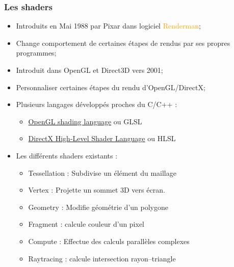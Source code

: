 \documentclass{beamer}
\begin{document}
\begin{frame}[fragile]
\frametitle{Les shaders}

\begin{itemize}
\item Introduits en Mai 1988 par Pixar dans logiciel \textcolor{orange}{Renderman};
\item Change comportement de certaines étapes de rendus par ses propres programmes;
\item Introduit dans OpenGL et Direct3D vers 2001;
\item Personnaliser certaines étapes du rendu d'OpenGL/DirectX;
\item Plusieurs langages développés proches du C/C++ :
      \begin{itemize}
      \small
      \item \href{https://registry.khronos.org/OpenGL/specs/gl/GLSLangSpec.4.60.pdf}{\textcolor{NavyBlue}{OpenGL shading language}} ou \textcolor{BrickRed}{GLSL}
      \item \href{https://microsoft.github.io/hlsl-specs/specs/hlsl.pdf}{\textcolor{NavyBlue}{DirectX High-Level Shader Language}} ou \textcolor{BrickRed}{HLSL}
      \end{itemize}
\item Les différents shaders existants :
     \begin{itemize}
     \small
     \item \textcolor{NavyBlue}{Tessellation} : Subdivise un élément du maillage
     \item \textcolor{NavyBlue}{Vertex}   : Projette un sommet 3D vers écran.
     \item \textcolor{NavyBlue}{Geometry} : Modifie géométrie d'un polygone
     \item \textcolor{NavyBlue}{Fragment} : calcule couleur d'un pixel
     \item \textcolor{NavyBlue}{Compute} : Effectue des calculs parallèles complexes
     \item \textcolor{NavyBlue}{Raytracing} : calcule intersection rayon--triangle
     \end{itemize}
\end{itemize}
\end{frame}
\end{document}
